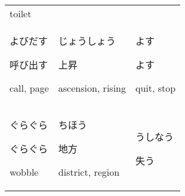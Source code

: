 \documentclass[12pt, a4j, landscape, dvipdfmx]{utarticle}
\begin{document}
\begin{minipage}[t][0pt]{\linewidth }
\begin{tabular}{||p{5.5cm}||p{5.5cm}||p{5.5cm}||}
            \rule{0pt}{3ex} \hspace*{.425cm} {\small
            toilet}\tabularnewline \hhline{|:=::=::=:|}
            \rule{0pt}{3ex} \hspace*{-.4cm} {\LARGE
            よびだす}\newline \rule{0pt}{3ex} \hspace*{.4cm}
            {\small 呼び出す}\newline \rule{0pt}{3ex}
            \hspace*{.425cm} {\small
            call, page}&\rule{0pt}{3ex} \hspace*{-.4cm}
            {\LARGE じょうしょう}\newline \rule{0pt}{3ex}
            \hspace*{.4cm} {\small 上昇}\newline
            \rule{0pt}{3ex} \hspace*{.425cm} {\small
            ascension, rising}&\rule{0pt}{3ex}
            \hspace*{-.4cm} {\LARGE よす}\newline
            \rule{0pt}{3ex} \hspace*{.4cm} {\small
            よす}\newline \rule{0pt}{3ex} \hspace*{.425cm}
            {\small quit, stop}\tabularnewline
            \hhline{|:=::=::=:|} \rule{0pt}{3ex}
            \hspace*{-.4cm} {\LARGE ぐらぐら}\newline
            \rule{0pt}{3ex} \hspace*{.4cm} {\small
            ぐらぐら}\newline \rule{0pt}{3ex} \hspace*{.425cm}
            {\small wobble}&\rule{0pt}{3ex} \hspace*{-.4cm}
            {\LARGE ちほう}\newline \rule{0pt}{3ex}
            \hspace*{.4cm} {\small 地方}\newline
            \rule{0pt}{3ex} \hspace*{.425cm} {\small
            district, region}&\rule{0pt}{3ex}
            \hspace*{-.4cm} {\LARGE うしなう}\newline
            \rule{0pt}{3ex} \hspace*{.4cm} {\small
            失う}\newline \rule{0pt}{3ex} \hspace*{.425cm}

\end{tabular}
\end{minipage}
\end{document}
